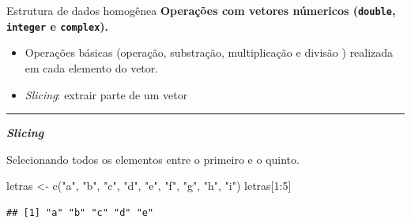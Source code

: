 \documentclass[
  10pt,
  ignorenonframetext,
]{beamer}
\newenvironment{Shaded}{}{}
\newcommand{\DecValTok}[1]{#1}
\newcommand{\KeywordTok}[1]{\textcolor[rgb]{0.00,0.00,1.00}{#1}}
\newcommand{\NormalTok}[1]{#1}
\newcommand{\OperatorTok}[1]{#1}
\newcommand{\StringTok}[1]{\textcolor[rgb]{0.00,0.50,0.50}{#1}}
\providecommand{\tightlist}{%
  \setlength{\itemsep}{0pt}\setlength{\parskip}{0pt}}
\begin{document}
\begin{frame}[fragile]{Estrutura de dados homogênea}
\protect\hypertarget{estrutura-de-dados-homoguxeanea-7}{}
\textbf{Operações com vetores númericos (\texttt{double},
\texttt{integer} e \texttt{complex}).}

\begin{itemize}
\tightlist
\item
  Operações básicas (operação, substração, multiplicação e divisão )
  realizada em cada elemento do vetor.
\item
  \emph{Slicing}: extrair parte de um vetor
\end{itemize}

\rule{\textwidth}{0.5pt}

\textbf{\emph{Slicing}}

Selecionando todos os elementos entre o primeiro e o quinto.

\begin{Shaded}
\begin{Highlighting}[]
\NormalTok{letras \textless{}{-}}\StringTok{ }\KeywordTok{c}\NormalTok{(}\StringTok{"a"}\NormalTok{, }\StringTok{"b"}\NormalTok{, }\StringTok{"c"}\NormalTok{, }\StringTok{"d"}\NormalTok{, }\StringTok{"e"}\NormalTok{, }\StringTok{"f"}\NormalTok{, }\StringTok{"g"}\NormalTok{, }\StringTok{"h"}\NormalTok{, }\StringTok{"i"}\NormalTok{)}
\NormalTok{letras[}\DecValTok{1}\OperatorTok{:}\DecValTok{5}\NormalTok{]}
\end{Highlighting}
\end{Shaded}

\begin{verbatim}
## [1] "a" "b" "c" "d" "e"
\end{verbatim}
\end{frame}
\end{document}

